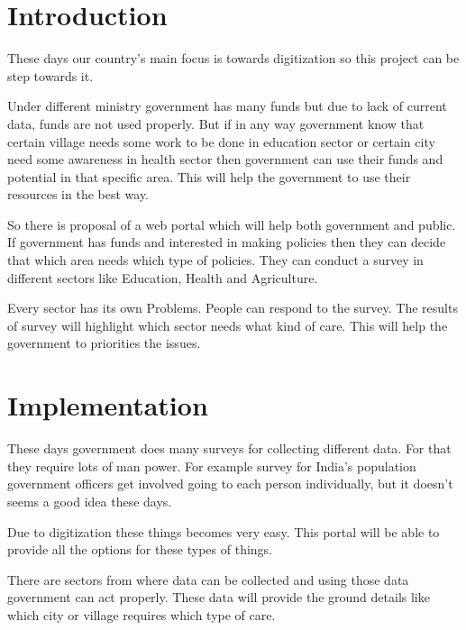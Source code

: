 \documentclass{sig-alternate}
\begin{document}



\section{Introduction}
These days our country's main focus is towards digitization so this project can be step towards it.

Under different ministry government has many funds but due to lack of current data, funds are not used properly. But if in any way government know that certain village needs some work to be done in education sector or certain city need some awareness in health sector then government can use their funds and potential in that specific area. This will help the government to use their resources in the best way. 

So there is proposal of a web portal which will help both government and public. If government has funds and interested in making policies then they can decide that which area needs which type of policies. They can conduct a survey in different sectors like Education, Health and Agriculture. 

Every sector has its own Problems. People can respond to the survey. The results of survey will highlight which sector needs what kind of care. This will help the government to priorities the issues. 

\section{Implementation}
These days government does many surveys for collecting different data. For that they require lots of man power. For example survey for India's population government officers get involved going to each person individually, but it doesn't seems a good idea these days.

Due to digitization these things becomes very easy. This portal will be able to provide all the options for these types of things.

There are sectors from where data can be collected and using those data government can act properly. These data will provide the ground details like which city or village requires which type of care. 
\end{document}
